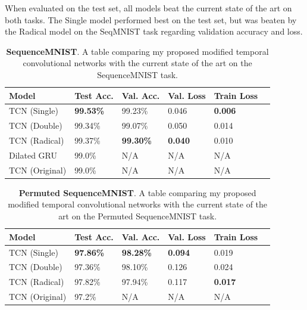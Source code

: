 \documentclass[a4paper, twoside]{article}
\begin{document}
When evaluated on the test set, all models beat the current state of the art on both tasks. The Single model performed best on the test set, but was beaten by the Radical model on the SeqMNIST task regarding validation accuracy and loss.

\begin{table}
\begin{center}
    \begin{tabular}{| l | l | l | l | l | l |}
    \hline
    Model & Test Acc. & Val. Acc. & Val. Loss & Train Loss\\ \hline \hline
    TCN (Single) & \textbf{99.53\%} & 99.23\% & 0.046 & \textbf{0.006} \\ \hline
    TCN (Double) & 99.34\% & 99.07\% & 0.050 & 0.014 \\ \hline
    TCN (Radical) & 99.37\% & \textbf{99.30\%} & \textbf{0.040} & 0.010 \\ \hline
    Dilated GRU \cite{dilatedgru} & 99.0\% & N/A & N/A & N/A \\ \hline
    TCN (Original) \cite{tcn} & 99.0\% & N/A & N/A & N/A \\ \hline
    \end{tabular}
    \caption{\textbf{SequenceMNIST}. A table comparing my proposed modified temporal convolutional networks with the current state of the art on the SequenceMNIST task.} \label{tabseqmnist}
\end{center}
\end{table}

\begin{table}
\begin{center}
    \begin{tabular}{| l | l | l | l | l | l |}
    \hline
    Model & Test Acc. & Val. Acc. & Val. Loss & Train Loss\\ \hline \hline
    TCN (Single) & \textbf{97.86\%} & \textbf{98.28\%} & \textbf{0.094}  & 0.019 \\ \hline
    TCN (Double) & 97.36\% & 98.10\% & 0.126  & 0.024 \\ \hline
    TCN (Radical) & 97.82\% & 97.94\% & 0.117  & \textbf{0.017} \\ \hline
    TCN (Original) \cite{tcn} & 97.2\% & N/A & N/A & N/A \\ \hline
    \end{tabular}
    \caption{\textbf{Permuted SequenceMNIST}. A table comparing my proposed modified temporal convolutional networks with the current state of the art on the Permuted SequenceMNIST task.} \label{tabpmnist}
\end{center}
\end{table}
\end{document}
